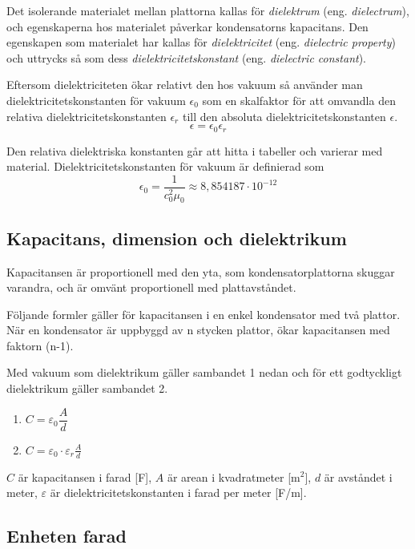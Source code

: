Det isolerande materialet mellan plattorna kallas för \emph{dielektrum}
(eng. \emph{dielectrum}), och egenskaperna hos materialet påverkar kondensatorns
kapacitans.
Den egenskapen som materialet har kallas för \emph{dielektricitet}
(eng. \emph{dielectric property}) och uttrycks så som dess
\emph{dielektricitetskonstant} (eng. \emph{dielectric constant}).

Eftersom dielektriciteten ökar relativt den hos vakuum så använder man
dielektricitetskonstanten för vakuum \(\epsilon_0\) som en skalfaktor för att
omvandla den relativa dielektricitetskonstanten \(\epsilon_r\) till den
absoluta dielektricitetskonstanten \(\epsilon\).
\[
  \epsilon = \epsilon_0\epsilon_r
\]

Den relativa dielektriska konstanten går att hitta i tabeller och varierar
med material. Dielektricitetskonstanten för vakuum är definierad som
\[
  \epsilon_0 = \dfrac{1}{c_0^2\mu_0} \approx 8,854187 \cdot 10^{-12}
\]

\subsection{Kapacitans, dimension och dielektrikum}

Kapacitansen är proportionell med den yta, som kondensatorplattorna skuggar
varandra, och är omvänt proportionell med plattavståndet.

Följande formler gäller för kapacitansen i en enkel kondensator med två
plattor. När en kondensator är uppbyggd av n stycken plattor, ökar kapacitansen
med faktorn (n-1).

Med vakuum som dielektrikum gäller sambandet 1 nedan och för ett godtyckligt
dielektrikum gäller sambandet 2.

\begin{enumerate}
  \item \(C = \varepsilon _0 \dfrac{A}{d}\)
  \item \(C = \varepsilon _0 \cdot \varepsilon _r \frac{A}{d}\)
\end{enumerate}

\(C\) är kapacitansen i farad [F], \(A\) är arean i kvadratmeter [m$^2$], $d$ är
avståndet i meter, $\varepsilon$ är dielektricitetskonstanten i farad per meter
[F/m].

\subsection{Enheten farad}

